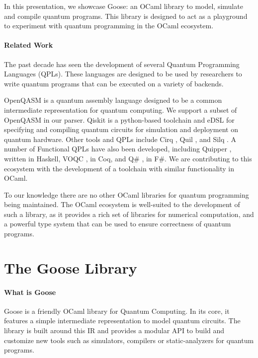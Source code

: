 \documentclass[a4paper]{easychair}
\begin{document}
In this presentation, we showcase Goose: an OCaml library to model, simulate and compile quantum programs. This library is designed to act as a playground to experiment with quantum programming in the OCaml ecosystem.

\paragraph*{Related Work}

The past decade has seen the development of several Quantum Programming Languages (QPLs). These languages are designed to be used by researchers to write quantum programs that can be executed on a variety of backends. 

OpenQASM \cite{Cross2022} is a quantum assembly language designed to be a common intermediate representation for quantum computing.  We support a subset of OpenQASM in our parser. Qiskit \cite{Qiskit} is a python-based toolchain and eDSL for specifying and compiling quantum circuits for simulation and deployment on quantum hardware. Other tools and QPLs include Cirq \cite{Cirq2018}, Quil \cite{Quil2016}, and Silq \cite{Bichsel2020}. A number of Functional QPLs have also been developed, including Quipper \cite{Green2013}, written in Haskell, VOQC \cite{Hietala2021}, in Coq, and Q\# \cite{Svore2018}, in F\#. We are contributing to this ecosystem with the development of a toolchain with similar functionality in OCaml.

To our knowledge there are no other OCaml libraries for quantum programming being maintained. The OCaml ecosystem is well-suited to the development of such a library, as it provides a rich set of libraries for numerical computation, and a powerful type system that can be used to ensure correctness of quantum programs.

\section{The Goose Library}

\paragraph*{What is Goose} Goose is a friendly OCaml library for Quantum Computing. In its core, it features a simple intermediate representation to model quantum circuits. The library is built around this IR and provides a modular API to build and customize new tools such as simulators, compilers or static-analyzers for quantum programs.
\end{document}
